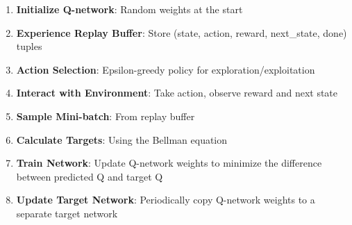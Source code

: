 \documentclass[
]{article}
\providecommand{\tightlist}{%
  \setlength{\itemsep}{0pt}\setlength{\parskip}{0pt}}
\begin{document}
\begin{enumerate}
\def\labelenumi{\arabic{enumi}.}
\tightlist
\item
  \textbf{Initialize Q-network}: Random weights at the start
\item
  \textbf{Experience Replay Buffer}: Store (state, action, reward,
  next\_state, done) tuples
\item
  \textbf{Action Selection}: Epsilon-greedy policy for
  exploration/exploitation
\item
  \textbf{Interact with Environment}: Take action, observe reward and
  next state
\item
  \textbf{Sample Mini-batch}: From replay buffer
\item
  \textbf{Calculate Targets}: Using the Bellman equation
\item
  \textbf{Train Network}: Update Q-network weights to minimize the
  difference between predicted Q and target Q
\item
  \textbf{Update Target Network}: Periodically copy Q-network weights to
  a separate target network
\end{enumerate}
\end{document}
